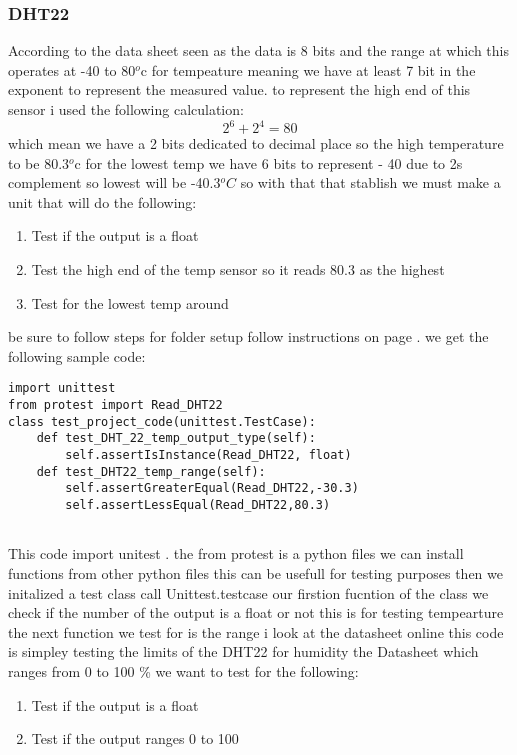 \subsubsection{DHT22}
According to the  data sheet \cite{sparkfun} seen as  the data is   8 bits  and  the  range at which this   operates at  -40 to 80$^{o}$c for tempeature
meaning we have  at least  7 bit in the  exponent to  represent  the   measured value.
to represent  the  high  end of this  sensor i used the  following calculation:
$$ 2^6 +2^4 = 80$$ which mean  we have  a 2 bits dedicated to decimal place so the  high temperature to be 80.3$^{o}$c
for the  lowest temp we have 6 bits  to  represent  - 40 due to  2s complement  so lowest  will   be -40.3$^{o}C$
so with that  that  stablish we  must  make a  unit  that will do  the  following:
\begin{enumerate}
    \item Test if the  output is  a float
    \item Test the  high end of  the  temp sensor so it  reads  80.3 as  the highest
    \item Test for the  lowest   temp   around 
\end{enumerate}
be sure to follow  steps  for  folder  setup  follow instructions on page \pageref{folderstructure}.
we get the following sample code:
\begin{lstlisting}[style=mystyle,caption={sample test intial code}]
import unittest
from protest import Read_DHT22
class test_project_code(unittest.TestCase):
    def test_DHT_22_temp_output_type(self):
        self.assertIsInstance(Read_DHT22, float)
    def test_DHT22_temp_range(self):
        self.assertGreaterEqual(Read_DHT22,-30.3)
        self.assertLessEqual(Read_DHT22,80.3)
    
\end{lstlisting} 
This code import unitest . the from protest is  a python files  we can  install  functions from other python files this can be usefull for testing purposes
then we initalized a test class call Unittest.testcase our firstion fucntion of the class  we  check if the number of the output  is a float or not this is  for  testing  tempearture
the next function we test for  is the range i look at the datasheet online   this code is  simpley testing the  limits of the  DHT22
for  humidity  the Datasheet which ranges from 0 to 100 \%
we want to test for the following:
\begin{enumerate}
    \item Test if the  output is  a float
    \item Test if the  output ranges 0 to 100
\end{enumerate}
